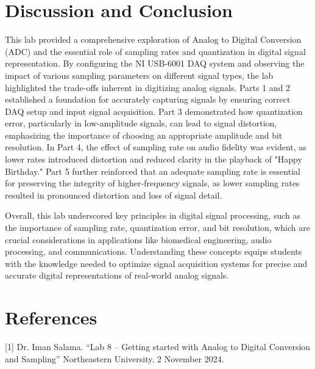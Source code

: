 \documentclass[12pt]{article}
\begin{document}
\section{Discussion and Conclusion}
This lab provided a comprehensive exploration of Analog to Digital Conversion
(ADC) and the essential role of sampling rates and quantization in digital
signal representation. By configuring the NI USB-6001 DAQ system and observing
the impact of various sampling parameters on different signal types, the lab
highlighted the trade-offs inherent in digitizing analog signals. Parts 1 and 2
established a foundation for accurately capturing signals by ensuring correct
DAQ setup and input signal acquisition. Part 3 demonstrated how quantization
error, particularly in low-amplitude signals, can lead to signal distortion,
emphasizing the importance of choosing an appropriate amplitude and bit
resolution. In Part 4, the effect of sampling rate on audio fidelity was evident,
as lower rates introduced distortion and reduced clarity in the playback of
"Happy Birthday." Part 5 further reinforced that an adequate sampling rate is
essential for preserving the integrity of higher-frequency signals, as lower
sampling rates resulted in pronounced distortion and loss of signal detail.
\newline

Overall, this lab underscored key principles in digital signal processing, such
as the importance of sampling rate, quantization error, and bit resolution,
which are crucial considerations in applications like biomedical engineering,
audio processing, and communications. Understanding these concepts equips
students with the knowledge needed to optimize signal acquisition systems for
precise and accurate digital representations of real-world analog signals.
\section{References}
 [1] Dr. Iman Salama. “Lab 8 – Getting started with Analog to Digital Conversion and Sampling” Northeastern University. 2 November 2024.
\end{document}

